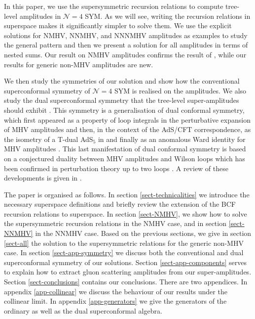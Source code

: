 \documentclass[12pt]{article}
\begin{document}
In this paper, we use the supersymmetric recursion relations to
compute tree-level amplitudes in $\mathcal{N}=4$ SYM. As we will
see, writing the recursion relations in superspace makes it
significantly simpler to solve them.
We use the explicit solutions for NMHV, NNMHV, and NNNMHV amplitudes as examples to study the general pattern and then
we present a solution for all amplitudes in terms of nested sums.
Our result on NMHV amplitudes confirms the result of \cite{dhks6}, while our
results for generic non-MHV amplitudes are new.

We then study the symmetries of our solution and show how the
conventional superconformal symmetry of $\mathcal{N}=4$ SYM is
realised on the amplitudes. We also study the dual superconformal
symmetry that the tree-level super-amplitudes should exhibit
\cite{dhks5}. This symmetry is a generalisation of dual conformal
symmetry, which first appeared as a property of loop integrals in the
perturbative expansion of MHV amplitudes
\cite{Drummond:2006rz,Bern:2006ew,Bern:2007ct} and then, in the
context of the AdS/CFT correspondence, as the isometry of a T-dual
AdS${}_5$ in \cite{Alday:2007hr,Alday:2007he} and finally as an
anomalous Ward identity for MHV amplitudes
\cite{Drummond:2007cf,Drummond:2007au}. This last manifestation of
dual conformal symmetry is based on a conjectured duality between MHV
amplitudes and Wilson loops
\cite{Alday:2007hr,Drummond:2007aua,Brandhuber:2007yx} which has been
confirmed in perturbation theory up to two loops
\cite{Drummond:2007cf,Drummond:2007au,Drummond:2007bm,Bern:2008ap,Drummond:2008aq}.
A review of these developments is given in \cite{Alday:2008yw}.

The paper is organised as follows. In section
\ref{sect-technicalities} we introduce the necessary superspace
definitions and briefly review the extension of the BCF recursion relations
to superspace. In section \ref{sect-NMHV}, we show how to solve the supersymmetric
recursion relations in the NMHV case, and in section
\ref{sect-NNMHV} in the NNMHV case. Based on the previous sections, we
give in section \ref{sect-all} the solution to the supersymmetric relations for the generic non-MHV case.
In section \ref{sect-app-symmetry} we discuss both the conventional and dual
superconformal symmetry of our solutions.
Section \ref{sect-app-components} serves to explain how to
extract gluon scattering amplitudes from our super-amplitudes.
Section \ref{sect-conclusions} contains our conclusions.
There are two appendices. In appendix \ref{app-collinear} we discuss the behaviour of
our results under the collinear limit.
In appendix \ref{app-generators} we give the generators of the ordinary as well as the dual
superconformal algebra.
\end{document}
